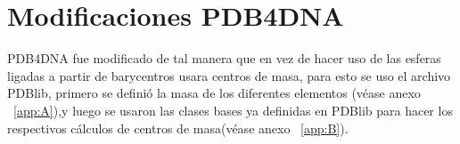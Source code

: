 
\clearpage

\section{Modificaciones PDB4DNA}
\label{sec:MODIFI}
PDB4DNA fue modificado de tal manera que en vez de hacer uso de las esferas ligadas a partir de barycentros usara centros de masa, para esto se uso el archivo PDBlib, primero se definió la masa de los diferentes elementos (véase anexo ~\ref{app:A}),y luego se usaron las clases bases ya definidas en PDBlib para hacer los respectivos cálculos de centros de masa(véase anexo ~\ref{app:B}).\\
